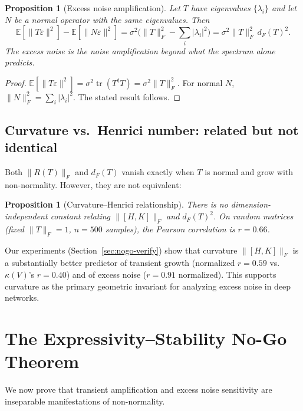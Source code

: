 \documentclass[11pt,a4paper]{article}
\newtheorem{proposition}[theorem]{Proposition}
\theoremstyle{definition}
\DeclareMathOperator{\tr}{tr}
\begin{document}
\begin{proposition}[Excess noise amplification]
\label{prop:excess-noise}
Let $T$ have eigenvalues $\{\lambda_i\}$ and let $N$ be a normal operator
with the same eigenvalues. Then
\[
  \mathbb{E}[\|T\varepsilon\|^2] - \mathbb{E}[\|N\varepsilon\|^2]
  = \sigma^2 \bigl(\|T\|_F^2 - \textstyle\sum_i |\lambda_i|^2\bigr)
  = \sigma^2 \|T\|_F^2 \, d_F(T)^2.
\]
The excess noise is the noise amplification \emph{beyond what the
spectrum alone predicts}.
\end{proposition}

\begin{proof}
$\mathbb{E}[\|T\varepsilon\|^2] = \sigma^2 \tr(T^\dagger T)
= \sigma^2 \|T\|_F^2$. For normal $N$,
$\|N\|_F^2 = \sum_i |\lambda_i|^2$. The stated result follows.
\end{proof}

\subsection{Curvature vs.\ Henrici number: related but not identical}

Both $\|R(T)\|_F$ and $d_F(T)$ vanish exactly when $T$ is normal and
grow with non-normality. However, they are not equivalent:

\begin{proposition}[Curvature--Henrici relationship]
\label{prop:curvature-henrici}
There is no dimension-independent constant relating $\|[H,K]\|_F$
and $d_F(T)^2$. On random matrices (fixed $\|T\|_F = 1$, $n = 500$
samples), the Pearson correlation is $r = 0.66$.
\end{proposition}

Our experiments (Section~\ref{sec:nogo-verify}) show that curvature
$\|[H,K]\|_F$ is a substantially better predictor of transient growth
(normalized $r = 0.59$ vs.\ $\kappa(V)$'s $r = 0.40$) and of excess
noise ($r = 0.91$ normalized). This supports curvature as the primary
geometric invariant for analyzing excess noise in deep networks.

\section{The Expressivity--Stability No-Go Theorem}
\label{sec:nogo}

We now prove that transient amplification and excess noise sensitivity
are inseparable manifestations of non-normality.
\end{document}

